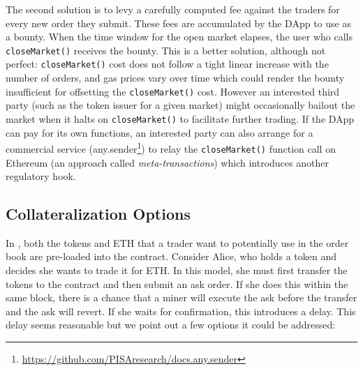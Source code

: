 The second solution is to levy a carefully computed fee against the traders for every new order they submit. These fees are accumulated by the DApp to use as a bounty. When the time window for the open market elapses, the user who calls \texttt{closeMarket()} receives the bounty. This is a better solution, although not perfect: \texttt{closeMarket()} cost does not follow a tight linear increase with the number of orders, and gas prices vary over time which could render the bounty insufficient for offsetting the \texttt{closeMarket()} cost. However an interested third party (such as the token issuer for a given market) might occasionally bailout the market when it halts on \texttt{closeMarket()} to facilitate further trading. If the DApp can pay for its own functions, an interested party can also arrange for a commercial service (\eg any.sender\footnote{\url{https://github.com/PISAresearch/docs.any.sender}}) to relay the \texttt{closeMarket()} function call on Ethereum (an approach called \textit{meta-transactions}) which introduces another regulatory hook.

\subsection{Collateralization Options}

In \cm, both the tokens and ETH that a trader want to potentially use in the order book are pre-loaded into the contract. Consider Alice, who holds a token and decides she wants to trade it for ETH. In this model, she must first transfer the tokens to the contract and then submit an ask order. If she does this within the same block, there is a chance that a miner will execute the ask before the transfer and the ask will revert. If she waits for confirmation, this introduces a delay. This delay seems reasonable but we point out a few options it could be addressed: 

